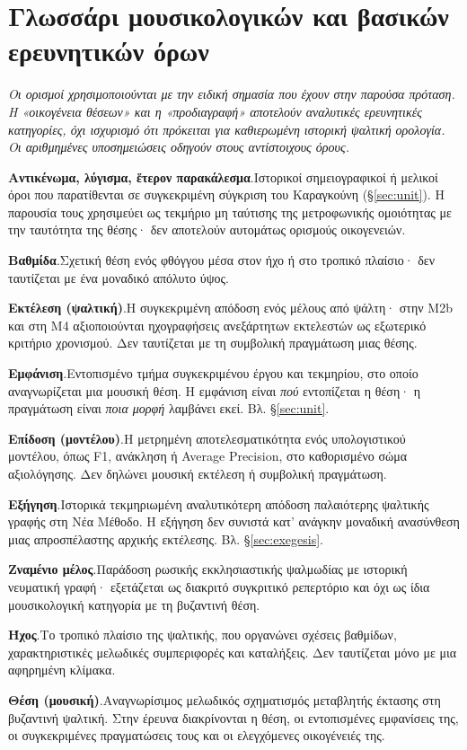 \documentclass[a4paper]{article}
\newcommand{\glossterm}[3]{\par\noindent\hypertarget{gl:#1}{\textbf{#2}.}\enspace #3\par}
\begin{document}
\section*{Γλωσσάρι μουσικολογικών και βασικών ερευνητικών όρων}\label{sec:glossary}
\noindent\textit{Οι ορισμοί χρησιμοποιούνται με την ειδική σημασία που έχουν στην παρούσα πρόταση. Η «οικογένεια θέσεων» και η «προδιαγραφή» αποτελούν αναλυτικές ερευνητικές κατηγορίες, όχι ισχυρισμό ότι πρόκειται για καθιερωμένη ιστορική ψαλτική ορολογία. Οι αριθμημένες υποσημειώσεις οδηγούν στους αντίστοιχους όρους.}
\par\medskip
\begingroup
\setlength{\parskip}{3pt}
\small
\glossterm{traditional-names}{Αντικένωμα, λύγισμα, ἕτερον παρακάλεσμα}{Ιστορικοί σημειογραφικοί ή μελικοί όροι που παρατίθενται σε συγκεκριμένη σύγκριση του Καραγκούνη (§\ref{sec:unit}). Η παρουσία τους χρησιμεύει ως τεκμήριο μη ταύτισης της μετροφωνικής ομοιότητας με την ταυτότητα της θέσης· δεν αποτελούν αυτομάτως ορισμούς οικογενειών.}
\glossterm{degree}{Βαθμίδα}{Σχετική θέση ενός φθόγγου μέσα στον ήχο ή στο τροπικό πλαίσιο· δεν ταυτίζεται με ένα μοναδικό απόλυτο ύψος.}
\glossterm{chant-performance}{Εκτέλεση (ψαλτική)}{Η συγκεκριμένη απόδοση ενός μέλους από ψάλτη· στην Μ2b και στη Μ4 αξιοποιούνται ηχογραφήσεις ανεξάρτητων εκτελεστών ως εξωτερικό κριτήριο χρονισμού. Δεν ταυτίζεται με τη συμβολική πραγμάτωση μιας θέσης.}
\glossterm{occurrence}{Εμφάνιση}{Εντοπισμένο τμήμα συγκεκριμένου έργου και τεκμηρίου, στο οποίο αναγνωρίζεται μια μουσική θέση. Η εμφάνιση είναι \emph{πού} εντοπίζεται η θέση· η πραγμάτωση είναι \emph{ποια μορφή} λαμβάνει εκεί. Βλ. §\ref{sec:unit}.}
\glossterm{model-performance}{Επίδοση (μοντέλου)}{Η μετρημένη αποτελεσματικότητα ενός υπολογιστικού μοντέλου, όπως F1, ανάκληση ή Average Precision, στο καθορισμένο σώμα αξιολόγησης. Δεν δηλώνει μουσική εκτέλεση ή συμβολική πραγμάτωση.}
\glossterm{exegesis}{Εξήγηση}{Ιστορικά τεκμηριωμένη αναλυτικότερη απόδοση παλαιότερης ψαλτικής γραφής στη Νέα Μέθοδο. Η εξήγηση δεν συνιστά κατ' ανάγκην μοναδική ανασύνθεση μιας απροσπέλαστης αρχικής εκτέλεσης. Βλ. §\ref{sec:exegesis}.}
\glossterm{znamenny}{Ζναμένιο μέλος}{Παράδοση ρωσικής εκκλησιαστικής ψαλμωδίας με ιστορική νευματική γραφή· εξετάζεται ως διακριτό συγκριτικό ρεπερτόριο και όχι ως ίδια μουσικολογική κατηγορία με τη βυζαντινή θέση.}
\glossterm{echos}{Ήχος}{Το τροπικό πλαίσιο της ψαλτικής, που οργανώνει σχέσεις βαθμίδων, χαρακτηριστικές μελωδικές συμπεριφορές και καταλήξεις. Δεν ταυτίζεται μόνο με μια αφηρημένη κλίμακα.}
\glossterm{formula}{Θέση (μουσική)}{Αναγνωρίσιμος μελωδικός σχηματισμός μεταβλητής έκτασης στη βυζαντινή ψαλτική. Στην έρευνα διακρίνονται η θέση, οι εντοπισμένες εμφανίσεις της, οι συγκεκριμένες πραγματώσεις τους και οι ελεγχόμενες οικογένειές της.}
\end{document}
